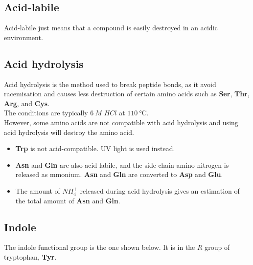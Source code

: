 \documentclass[11pt]{article}
\begin{document}
\subsection{Acid-labile}
\label{sec:orgdcc94a3}
Acid-labile just means that a compound is easily destroyed in an acidic environment.

\subsection{Acid hydrolysis}
\label{sec:org4a2693c}
Acid hydrolysis is the method used to break peptide bonds, as it avoid racemisation and causes less destruction of certain amino acids such as \textbf{Ser}, \textbf{Thr}, \textbf{Arg}, and \textbf{Cys}.
\\[0pt]

The conditions are typically \(\qty{6}{\unit{M}}\) \(HCl\) at \(\qty{110}{\unit{\degreeCelsius}}\).
\\[0pt]

However, some amino acids are not compatible with acid hydrolysis and using acid hydrolysis will destroy the amino acid.
\begin{itemize}
\item \textbf{Trp} is not acid-compatible. UV light is used instead.
\item \textbf{Asn} and \textbf{Gln} are also acid-labile, and the side chain amino nitrogen is released as mmonium. \textbf{Asn} and \textbf{Gln} are converted to \textbf{Asp} and \textbf{Glu}.
\item The amount of \(NH_4^+\) released during acid hydrolysis gives an estimation of the total amount of \textbf{Asn} and \textbf{Gln}.
\end{itemize}

\subsection{Indole}
\label{sec:org12b3d91}
The indole functional group is the one shown below. It is in the \(R\) group of tryptophan, \textbf{Tyr}.
\end{document}

